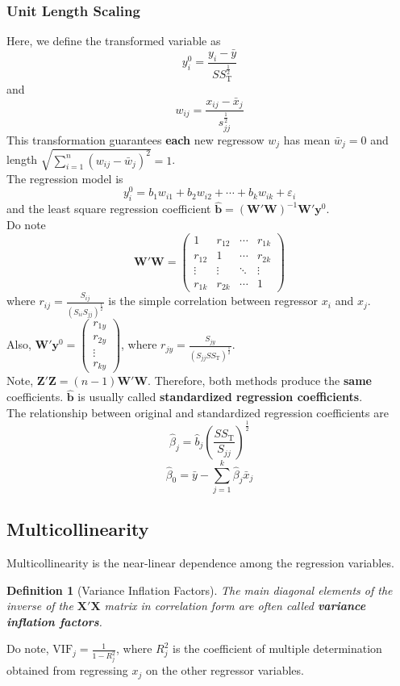 \documentclass[11pt]{article}
\newtheorem{definition}{Definition}[section]
\theoremstyle{definition}
\begin{document}
\subsubsection{Unit Length Scaling}
Here, we define the transformed variable as
\[
y_i^{0}=\frac{y_i-\bar{y}}{SS_\text{T}^{\frac{1}{2}}}
\]
and
\[
w_{ij}=\frac{x_{ij}-\bar{x}_j}{s_{jj}^{\frac{1}{2}}}
\]
This transformation guarantees \textbf{each} new regressow $w_{j}$ has mean $\bar{w}_j=0$ and length $\sqrt{\sum_{i=1}^n(w_{ij}-\bar{w}_j)^2}=1$.\\
The regression model is
\[
y_i^{0}=b_1w_{i1}+b_2w_{i2}+\cdots+b_kw_{ik}+\varepsilon_i
\]
and the least square regression coefficient $\bm{\hat{b}}=(\bm{W}'\bm{W})^{-1}\bm{W}'\bm{y}^{0}$.\\
Do note 
\[
\bm{W}'\bm{W}=\begin{pmatrix} 1 & r_{12} & \cdots & r_{1k}\\
r_{12} & 1 & \cdots & r_{2k}\\
\vdots&\vdots&\ddots&\vdots\\
r_{1k}&r_{2k}&\cdots &1
\end{pmatrix}
\]
where $r_{ij}=\frac{S_{ij}}{(S_{ii}S_{jj})^\frac{1}{2}}$ is the simple correlation between regressor $x_i$ and $x_j$.\\
Also, $\bm{W}'\bm{y}^{0}=\begin{pmatrix} r_{1y}\\r_{2y}\\\vdots\\r_{ky}\end{pmatrix}$, where $r_{jy}=\frac{S_{jy}}{(S_{jj}SS_\text{T})^\frac{1}{2}}$.\\
Note, $\bm{Z}'\bm{Z}=(n-1)\bm{W}'\bm{W}$. Therefore, both methods produce the \textbf{same} coefficients. $\hat{\bm{b}}$ is usually called \textbf{standardized regression coefficients}.\\
The relationship between original and standardized regression coefficients are
\[
\hat{\beta}_j=\hat{b}_j(\frac{SS_\text{T}}{S_{jj}})^\frac{1}{2}
\]
\[
\hat{\beta}_0=\bar{y}-\sum_{j=1}^k \hat{\beta}_j\bar{x}_j
\]
\subsection{Multicollinearity}
Multicollinearity is the near-linear dependence among the regression variables.
\begin{definition}[Variance Inflation Factors]
\normalfont The main diagonal elements of the inverse of the $\bm{X}'\bm{X}$ matrix in correlation form are often called \textbf{variance inflation factors}.
\end{definition}
Do note, $\text{VIF}_j=\frac{1}{1-R_j^2}$, where $R_j^2$ is the coefficient of multiple determination obtained from regressing $x_j$ on the other regressor variables.
\end{document}
